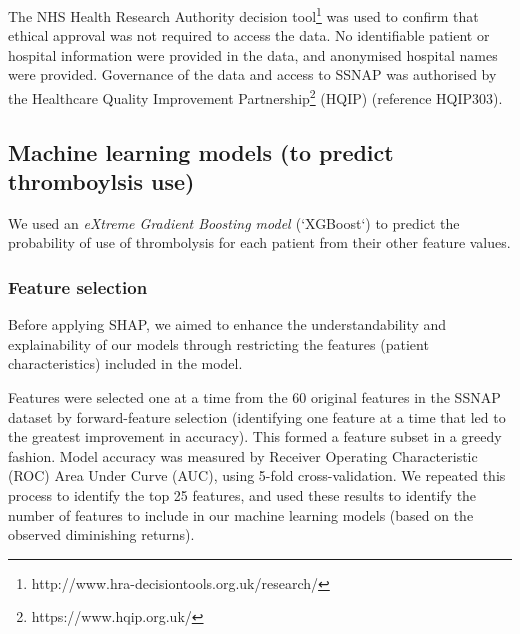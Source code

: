 The NHS Health Research Authority decision tool\footnote{http://www.hra-decisiontools.org.uk/research/} was used to confirm that ethical approval was not required to access the data. No identifiable patient or hospital information were provided in the data, and anonymised hospital names were provided. Governance of the data and access to SSNAP was authorised by the Healthcare Quality Improvement Partnership\footnote{https://www.hqip.org.uk/} (HQIP) (reference HQIP303). 

\subsection{Machine learning models (to predict thromboylsis use)}
We used an \emph{eXtreme Gradient Boosting model \cite{chen_xgboost_2016}} (`XGBoost`) to predict the probability of use of thrombolysis for each patient from their other feature values.

\subsubsection{Feature selection}
Before applying SHAP, we aimed to enhance the understandability and explainability of our models through restricting the features (patient characteristics) included in the model. 

Features were selected one at a time from the 60 original features in the SSNAP dataset by forward-feature selection \cite{ferri_comparative_1994} (identifying one feature at a time that led to the greatest improvement in accuracy). This formed a feature subset in a greedy fashion. Model accuracy was measured by Receiver Operating Characteristic (ROC) Area Under Curve (AUC), using 5-fold cross-validation. We repeated this process to identify the top 25 features, and used these results to identify the number of features to include in our machine learning models (based on the observed diminishing returns).


